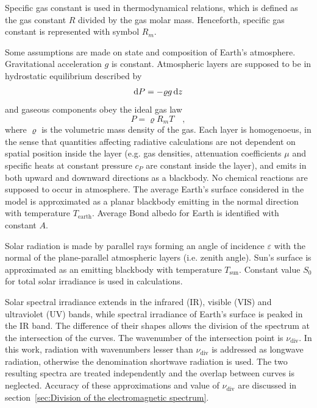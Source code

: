 \documentclass[a4paper,10pt,twocolumn,\classoptions]{article}
\begin{document}
Specific gas constant is used in thermodynamical relations, which is defined as the gas constant $R$ divided by the gas molar mass. Henceforth, specific gas constant is represented with symbol $R_m$.

Some assumptions are made on state and composition of Earth's atmosphere. Gravitational acceleration $g$ is constant. Atmospheric layers are supposed to be in hydrostatic equilibrium described by
\begin{equation}
  \label{eq:hydrostatic_equilibrium}
  \odif{P} = - \varrho g \odif{z}
\end{equation}
and gaseous components obey the ideal gas law
\begin{equation}
  \label{eq:ideal_gas_law}
  P = \varrho R_m T
  \quad ,
\end{equation}
where $\varrho$ is the volumetric mass density of the gas.
Each layer is homogenoeus, in the sense that quantities affecting radiative calculations are not dependent on spatial position inside the layer (e.g. gas densities, attenuation coefficients $\mu$ and specific heats at constant pressure $c_P$ are constant inside the layer), and emits in both upward and downward directions as a blackbody. No chemical reactions are supposed to occur in atmosphere.
The average Earth's surface considered in the model is approximated as a planar blackbody emitting in the normal direction with temperature $T_\text{earth}$. Average Bond albedo for Earth is identified with constant $A$.

Solar radiation is made by parallel rays forming an angle of incidence $\varepsilon$ with the normal of the plane-parallel atmospheric layers (i.e. zenith angle). %
Sun's surface is approximated as an emitting blackbody with temperature $T_\text{sun}$. Constant value $S_0$ for total solar irradiance is used in calculations.

Solar spectral irradiance extends in the infrared (IR), visible (VIS) and ultraviolet (UV) bands, while spectral irradiance of Earth's surface is peaked in the IR band. The difference of their shapes allows the division of the spectrum at the intersection of the curves. The wavenumber of the intersection point is $\nu_\text{div}$. In this work, radiation with wavenumbers lesser than $\nu_\text{div}$ is addressed as longwave radiation, otherwise the denomination shortwave radiation is used. The two resulting spectra are treated independently and the overlap between curves is neglected. Accuracy of these approximations and value of $\nu_\text{div}$ are discussed in section~\ref{sec:Division of the electromagnetic spectrum}.
\end{document}
